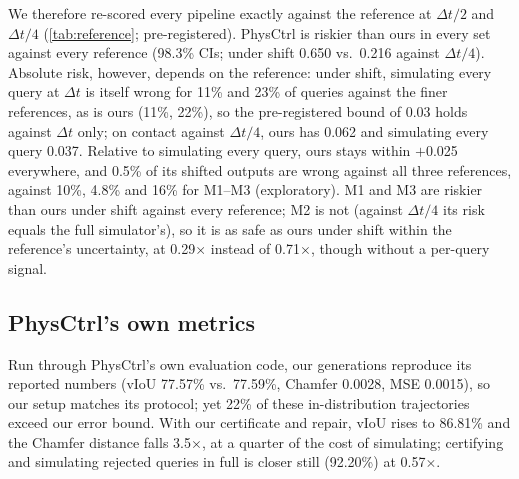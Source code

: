 We therefore re-scored every pipeline exactly against the reference at $\Delta t/2$ and $\Delta t/4$ (\cref{tab:reference}; pre-registered).
PhysCtrl is riskier than ours in every set against every reference (98.3\% CIs; under shift 0.650 vs.\ 0.216 against $\Delta t/4$).
Absolute risk, however, depends on the reference: under shift, simulating every query at $\Delta t$ is itself wrong for 11\% and 23\% of queries against the finer references, as is ours (11\%, 22\%), so the pre-registered bound of 0.03 holds against $\Delta t$ only; on contact against $\Delta t/4$, ours has 0.062 and simulating every query 0.037.
Relative to simulating every query, ours stays within $+$0.025 everywhere, and 0.5\% of its shifted outputs are wrong against all three references, against 10\%, 4.8\% and 16\% for M1--M3 (exploratory).
M1 and M3 are riskier than ours under shift against every reference; M2 is not (against $\Delta t/4$ its risk equals the full simulator's), so it is as safe as ours under shift within the reference's uncertainty, at 0.29$\times$ instead of 0.71$\times$, though without a per-query signal.

\subsection{PhysCtrl's own metrics}
\label{sec:res-physctrl}
\begin{table}[t]
\centering
\footnotesize
\setlength{\tabcolsep}{3.5pt}
\caption{\textbf{PhysCtrl's 100-object test set and metrics}, computed with PhysCtrl's own evaluation code; PhysCtrl reports 25 sampling steps, we sample with 4. Development data (descriptive).}
\label{tab:physctrl}
\end{table}
Run through PhysCtrl's own evaluation code, our generations reproduce its reported numbers (vIoU 77.57\% vs.\ 77.59\%, Chamfer 0.0028, MSE 0.0015), so our setup matches its protocol; yet 22\% of these in-distribution trajectories exceed our error bound.
With our certificate and repair, vIoU rises to 86.81\% and the Chamfer distance falls 3.5$\times$, at a quarter of the cost of simulating; certifying and simulating rejected queries in full is closer still (92.20\%) at 0.57$\times$.

